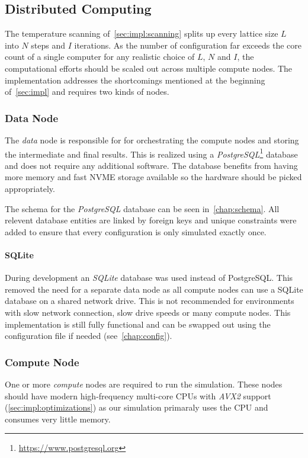 \subsection{Distributed Computing}\label{sec:impl:computing}
	The temperature scanning of~\cref{sec:impl:scanning} splits up every lattice size $L$ into $N$ steps and $I$ iterations. As the number of configuration far exceeds the core count of a single computer for any realistic choice of $L$, $N$ and $I$, the computational efforts should be scaled out across multiple compute nodes. The implementation addresses the shortcomings mentioned at the beginning of~\cref{sec:impl} and requires two kinds of nodes.
	
	\subsubsection{Data Node}\label{sec:impl:computing:data}
		The \emph{data} node is responsible for for orchestrating the compute nodes and storing the intermediate and final results. This is realized using a  \emph{PostgreSQL}\footnote{\url{https://www.postgresql.org}} database and does not require any additional software. The database benefits from having more memory and fast NVME storage available so the hardware should be picked appropriately.
		
		The schema for the \emph{PostgreSQL} database can be seen in~\cref{chap:schema}. All relevent database entities are linked by foreign keys and unique constraints were added to ensure that every configuration is only simulated exactly once.
		
		\paragraph{SQLite}
			During development an \emph{SQLite} database was used instead of PostgreSQL. This removed the need for a separate data node as all compute nodes can use a SQLite database on a shared network drive. This is not recommended for environments with slow network connection, slow drive speeds or many compute nodes.  This implementation is still fully functional and can be swapped out using the configuration file if needed (see~\cref{chap:config}).
	
	\subsubsection{Compute Node}\label{sec:impl:computing:compute}
		One or more \emph{compute} nodes are required to run the simulation. These nodes should have modern high-frequency multi-core CPUs with \emph{AVX2} support (\cref{sec:impl:optimizations}) as our simulation primaraly uses the CPU and consumes very little memory.
		
